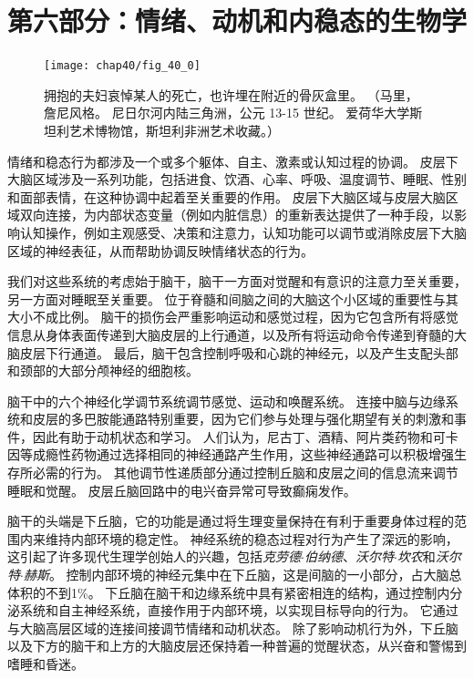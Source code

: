 \chapter*{第六部分：情绪、动机和内稳态的生物学}

\begin{figure}[htbp]
	\centering
	\texttt{[image: chap40/fig\_40\_0]}
	\caption{拥抱的夫妇哀悼某人的死亡，也许埋在附近的骨灰盒里。
		（马里，詹尼风格。
		尼日尔河内陆三角洲，公元 13-15 世纪。
		爱荷华大学斯坦利艺术博物馆，斯坦利非洲艺术收藏。）}
	\label{fig:40_0}
\end{figure}


情绪和稳态行为都涉及一个或多个躯体、自主、激素或认知过程的协调。
皮层下大脑区域涉及一系列功能，包括进食、饮酒、心率、呼吸、温度调节、睡眠、性别和面部表情，在这种协调中起着至关重要的作用。
皮层下大脑区域与皮层大脑区域双向连接，为内部状态变量（例如内脏信息）的重新表达提供了一种手段，以影响认知操作，例如主观感受、决策和注意力，认知功能可以调节或消除皮层下大脑区域的神经表征，从而帮助协调反映情绪状态的行为。



我们对这些系统的考虑始于脑干，脑干一方面对觉醒和有意识的注意力至关重要，另一方面对睡眠至关重要。
位于脊髓和间脑之间的大脑这个小区域的重要性与其大小不成比例。
脑干的损伤会严重影响运动和感觉过程，因为它包含所有将感觉信息从身体表面传递到大脑皮层的上行通道，以及所有将运动命令传递到脊髓的大脑皮层下行通道。
最后，脑干包含控制呼吸和心跳的神经元，以及产生支配头部和颈部的大部分颅神经的细胞核。


脑干中的六个神经化学调节系统调节感觉、运动和唤醒系统。
连接中脑与边缘系统和皮层的多巴胺能通路特别重要，因为它们参与处理与强化期望有关的刺激和事件，因此有助于动机状态和学习。
人们认为，尼古丁、酒精、阿片类药物和可卡因等成瘾性药物通过选择相同的神经通路产生作用，这些神经通路可以积极增强生存所必需的行为。
其他调节性递质部分通过控制丘脑和皮层之间的信息流来调节睡眠和觉醒。
皮层丘脑回路中的电兴奋异常可导致癫痫发作。


脑干的头端是下丘脑，它的功能是通过将生理变量保持在有利于重要身体过程的范围内来维持内部环境的稳定性。
神经系统的稳态过程对行为产生了深远的影响，这引起了许多现代生理学创始人的兴趣，包括\textit{克劳德$\cdot$伯纳德}、\textit{沃尔特$\cdot$坎农}和\textit{沃尔特$\cdot$赫斯}。
控制内部环境的神经元集中在下丘脑，这是间脑的一小部分，占大脑总体积的不到1\%。
下丘脑在脑干和边缘系统中具有紧密相连的结构，通过控制内分泌系统和自主神经系统，直接作用于内部环境，以实现目标导向的行为。
它通过与大脑高层区域的连接间接调节情绪和动机状态。
除了影响动机行为外，下丘脑以及下方的脑干和上方的大脑皮层还保持着一种普遍的觉醒状态，从兴奋和警惕到嗜睡和昏迷。


